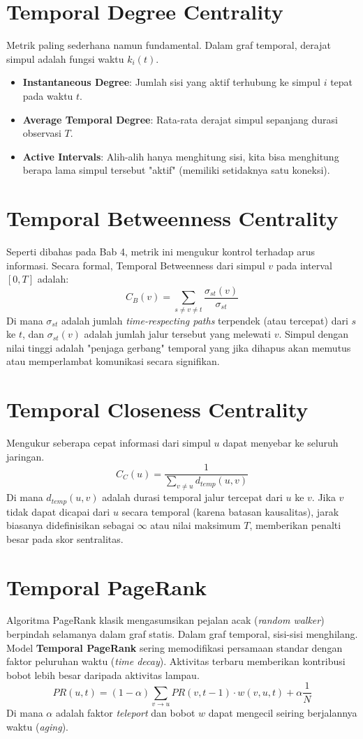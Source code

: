 \documentclass[12pt,a4paper]{book}
\begin{document}
\section{Temporal Degree Centrality}
Metrik paling sederhana namun fundamental. Dalam graf temporal, derajat simpul adalah fungsi waktu $k_i(t)$.
\begin{itemize}
    \item \textbf{Instantaneous Degree}: Jumlah sisi yang aktif terhubung ke simpul $i$ tepat pada waktu $t$.
    \item \textbf{Average Temporal Degree}: Rata-rata derajat simpul sepanjang durasi observasi $T$.
    \item \textbf{Active Intervals}: Alih-alih hanya menghitung sisi, kita bisa menghitung berapa lama simpul tersebut "aktif" (memiliki setidaknya satu koneksi).
\end{itemize}

\section{Temporal Betweenness Centrality}
Seperti dibahas pada Bab 4, metrik ini mengukur kontrol terhadap arus informasi. Secara formal, Temporal Betweenness dari simpul $v$ pada interval $[0, T]$ adalah:
$$ C_B(v) = \sum_{s \ne v \ne t} \frac{\sigma_{st}(v)}{\sigma_{st}} $$
Di mana $\sigma_{st}$ adalah jumlah \textit{time-respecting paths} terpendek (atau tercepat) dari $s$ ke $t$, dan $\sigma_{st}(v)$ adalah jumlah jalur tersebut yang melewati $v$. Simpul dengan nilai tinggi adalah "penjaga gerbang" temporal yang jika dihapus akan memutus atau memperlambat komunikasi secara signifikan.

\section{Temporal Closeness Centrality}
Mengukur seberapa cepat informasi dari simpul $u$ dapat menyebar ke seluruh jaringan.
$$ C_C(u) = \frac{1}{\sum_{v \ne u} d_{temp}(u, v)} $$
Di mana $d_{temp}(u, v)$ adalah durasi temporal jalur tercepat dari $u$ ke $v$. Jika $v$ tidak dapat dicapai dari $u$ secara temporal (karena batasan kausalitas), jarak biasanya didefinisikan sebagai $\infty$ atau nilai maksimum $T$, memberikan penalti besar pada skor sentralitas.

\section{Temporal PageRank}
Algoritma PageRank klasik mengasumsikan pejalan acak (\textit{random walker}) berpindah selamanya dalam graf statis. Dalam graf temporal, sisi-sisi menghilang.
Model \textbf{Temporal PageRank} sering memodifikasi persamaan standar dengan faktor peluruhan waktu (\textit{time decay}). Aktivitas terbaru memberikan kontribusi bobot lebih besar daripada aktivitas lampau.
$$ PR(u, t) = (1-\alpha) \sum_{v \to u} PR(v, t-1) \cdot w(v, u, t) + \alpha \frac{1}{N} $$
Di mana $\alpha$ adalah faktor \textit{teleport} dan bobot $w$ dapat mengecil seiring berjalannya waktu (\textit{aging}).
\end{document}
